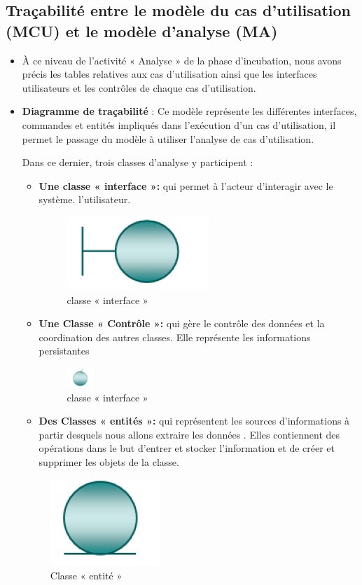 \documentclass[12 pt]{report}
\begin{document}
\subsection{Traçabilité entre le modèle du cas d’utilisation (MCU) et le modèle d’analyse (MA)}
\begin{itemize}[font=\color{black} \Large, label=]
\item À ce niveau de l’activité « Analyse » de la phase d’incubation, nous avons précis les tables relatives aux cas d’utilisation ainsi que les interfaces utilisateurs et les contrôles de chaque cas d’utilisation.
\item \textbf{ Diagramme de traçabilité} : Ce modèle représente les différentes interfaces,
commandes et entités impliqués dans l'exécution d'un cas d'utilisation, il permet le
passage du modèle à utiliser l'analyse de cas d’utilisation.


 Dans ce
dernier, trois classes d’analyse y participent :
\begin{itemize}[font=\color{black} \Large, label=]
\item \textbf{Une classe « interface »:}
 qui permet à
l’acteur d’interagir avec le
système. 
l’utilisateur.

\begin{figure}[h]
 \begin{center}
\includegraphics[width= 1 cm ,height= 1 cm]{int.png}
\caption{ classe « interface »}
\end{center}
\end{figure}


\item \textbf{Une Classe « Contrôle »:}
qui gère le contrôle des données
et la coordination des autres
classes. Elle représente les informations persistantes
\begin{figure}[h]
 \begin{center}
\includegraphics[width= 1cm ,height= 1 cm]{cntrl.png}
\caption{ classe « interface »}
\end{center}
\end{figure}

\item \textbf{Des Classes « entités »:}
qui
représentent les sources
d’informations à partir
desquels nous allons extraire
les données . Elles contiennent
des opérations dans le but d’entrer et stocker
l’information et de créer et
supprimer les objets de la
classe.
\end{itemize}
\begin{figure}[h]
 \begin{center}
\includegraphics[width= 1 cm ,height= 1 cm]{entite.png}
\caption{ Classe « entité »}
\end{center}
\end{figure}


\end{itemize}
\end{document}
